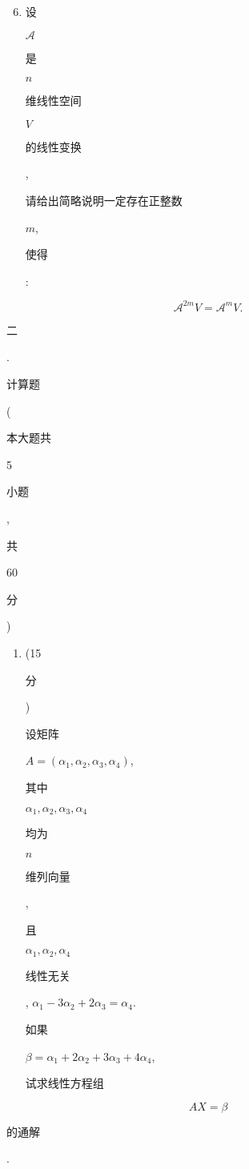 \documentclass[10pt]{article}
\begin{document}
\begin{enumerate}
  \setcounter{enumi}{5}
  \item \begin{CJK}{UTF8}{mj}设\end{CJK} $\mathscr{A}$ \begin{CJK}{UTF8}{mj}是\end{CJK} $n$ \begin{CJK}{UTF8}{mj}维线性空间\end{CJK} $V$ \begin{CJK}{UTF8}{mj}的线性变换\end{CJK}, \begin{CJK}{UTF8}{mj}请给出简略说明一定存在正整数\end{CJK} $m$, \begin{CJK}{UTF8}{mj}使得\end{CJK}:
\end{enumerate}
$$
\mathscr{A}^{2 m} V=\mathscr{A}^{m} V .
$$
\begin{CJK}{UTF8}{mj}二\end{CJK}. \begin{CJK}{UTF8}{mj}计算题\end{CJK} (\begin{CJK}{UTF8}{mj}本大题共\end{CJK} 5 \begin{CJK}{UTF8}{mj}小题\end{CJK}, \begin{CJK}{UTF8}{mj}共\end{CJK} 60 \begin{CJK}{UTF8}{mj}分\end{CJK})

\begin{enumerate}
  \item (15 \begin{CJK}{UTF8}{mj}分\end{CJK}) \begin{CJK}{UTF8}{mj}设矩阵\end{CJK} $A=\left(\alpha_{1}, \alpha_{2}, \alpha_{3}, \alpha_{4}\right)$, \begin{CJK}{UTF8}{mj}其中\end{CJK} $\alpha_{1}, \alpha_{2}, \alpha_{3}, \alpha_{4}$ \begin{CJK}{UTF8}{mj}均为\end{CJK} $n$ \begin{CJK}{UTF8}{mj}维列向量\end{CJK}, \begin{CJK}{UTF8}{mj}且\end{CJK} $\alpha_{1}, \alpha_{2}, \alpha_{4}$ \begin{CJK}{UTF8}{mj}线性无关\end{CJK}, $\alpha_{1}-3 \alpha_{2}+2 \alpha_{3}=\alpha_{4}$. \begin{CJK}{UTF8}{mj}如果\end{CJK} $\beta=\alpha_{1}+2 \alpha_{2}+3 \alpha_{3}+4 \alpha_{4}$, \begin{CJK}{UTF8}{mj}试求线性方程组\end{CJK}
\end{enumerate}
$$
A X=\beta
$$
\begin{CJK}{UTF8}{mj}的通解\end{CJK}.
\end{document}
